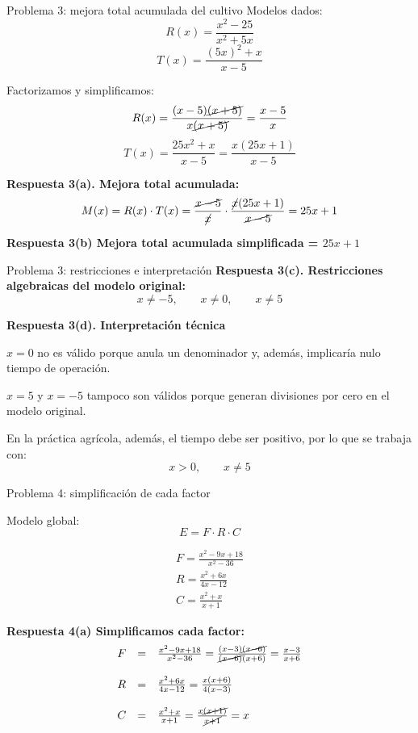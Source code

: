 \documentclass{beamer}
\begin{document}
	\begin{frame}{Problema 3: mejora total acumulada del cultivo}
		Modelos dados:
		\[
		R(x)=\frac{x^2-25}{x^2+5x}
		\]
		\[
		T(x)=\frac{(5x)^2+x}{x-5}
		\]
		
		Factorizamos y simplificamos:
		\[
		R(x)=\frac{(x-5){\cancel{(x+5)}}}{x\cancel{(x+5)}}=\frac{x-5}{x}
		\]
		\[
		T(x)=\frac{25x^2+x}{x-5}
		=\frac{x(25x+1)}{x-5}
		\]
		
		\textbf{Respuesta 3(a). Mejora total acumulada:}
		\[
		M(x)=R(x)\cdot T(x)
		=\frac{\cancel{x-5}}{\cancel{x}}\cdot \frac{\cancel{x}(25x+1)}{\cancel{x-5}}
		=25x+1
		\]
		
		\textbf{Respuesta 3(b) Mejora total acumulada simplificada = $25x+1$}
	\end{frame}
	
	\begin{frame}{Problema 3: restricciones e interpretación}
		\textbf{Respuesta 3(c). Restricciones algebraicas del modelo original:}
		\[
		x\neq -5,\qquad x\neq 0,\qquad x\neq 5
		\]
		
		\textbf{Respuesta 3(d). Interpretación técnica}
		
		\(x=0\) no es válido porque anula un denominador y, además, implicaría nulo tiempo de operación.
		
		\(x=5\) y \(x=-5\) tampoco son válidos porque generan divisiones por cero en el modelo original.
		
		En la práctica agrícola, además, el tiempo debe ser positivo, por lo que se trabaja con:
		\[
		x>0,\qquad x\neq 5
		\]
	\end{frame}
	
	\begin{frame}{Problema 4: simplificación de cada factor}
		
		Modelo global:
		\[	E=F\cdot R\cdot C	\]
		
		\[
		\begin{array}{l}
			F=\frac{x^2-9x+18}{x^2-36} \\
			R=\frac{x^2+6x}{4x-12} \\
			C=\frac{x^2+x}{x+1}
		\end{array}
		\]
		
		\textbf{Respuesta 4(a) Simplificamos cada factor:}
		\[
		\begin{array}{lcl}
		F&=&\frac{x^2-9x+18}{x^2-36}=\frac{(x-3)\cancel{(x-6)}}{\cancel{(x-6)}(x+6)}=\frac{x-3}{x+6}\\
	     & & \\
	    R&=&\frac{x^2+6x}{4x-12}=\frac{x(x+6)}{4(x-3)}\\
	     & & \\
	    C&=&\frac{x^2+x}{x+1}=\frac{x\cancel{(x+1)}}{\cancel{x+1}}=x
		\end{array}
		\]
		
	\end{frame}
	
\end{document}
